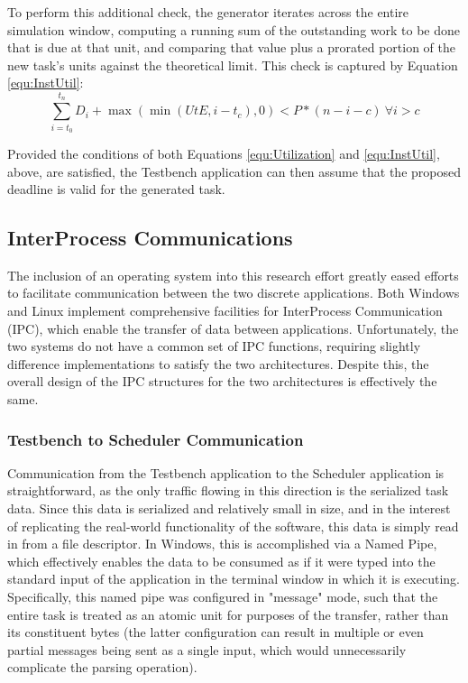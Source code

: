 To perform this additional check, the generator iterates across the entire simulation window, computing a running sum of the outstanding work to be done that is due at that unit, and comparing that value plus a prorated portion of the new task's units against the theoretical limit. This check is captured by Equation \ref{equ:InstUtil}:
\begin{equation}\label{equ:InstUtil}
    \sum_{i=t_0}^{t_n}D_i + \max(\min(UtE, i - t_c), 0) < P*(n-i-c)\:\forall i>c
\end{equation}

Provided the conditions of both Equations \ref{equ:Utilization} and \ref{equ:InstUtil}, above, are satisfied, the Testbench application can then assume that the proposed deadline is valid for the generated task.

\subsection{InterProcess Communications}\label{subsec:IPC}
The inclusion of an operating system into this research effort greatly eased efforts to facilitate communication between the two discrete applications. Both Windows and Linux implement comprehensive facilities for InterProcess Communication (IPC), which enable the transfer of data between applications. Unfortunately, the two systems do not have a common set of IPC functions, requiring slightly difference implementations to satisfy the two architectures. Despite this, the overall design of the IPC structures for the two architectures is effectively the same.

\subsubsection{Testbench to Scheduler Communication}\label{subsubsec:TestbenchSchedIPC}
Communication from the Testbench application to the Scheduler application is straightforward, as the only traffic flowing in this direction is the serialized task data. Since this data is serialized and relatively small in size, and in the interest of replicating the real-world functionality of the software, this data is simply read in from a file descriptor. In Windows, this is accomplished via a Named Pipe, which effectively enables the data to be consumed as if it were typed into the standard input of the application in the terminal window in which it is executing. Specifically, this named pipe was configured in "message" mode, such that the entire task is treated as an atomic unit for purposes of the transfer, rather than its constituent bytes (the latter configuration can result in multiple or even partial messages being sent as a single input, which would unnecessarily complicate the parsing operation).

